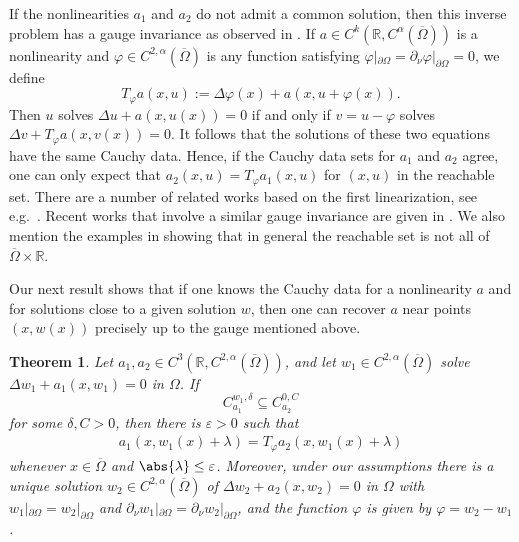 \documentclass[11pt,a4paper]{amsart}
\newtheorem{Theorem}{Theorem}[section]
\theoremstyle{definition}
\numberwithin{equation}{section}
\newcommand{\mR}{\mathbb{R}}                    %
\newcommand{\ol}[1]{\overline{#1}}
\newcommand{\eps}{\varepsilon}
\newcommand{\p}{\partial}
\newcommand{\Om}{\Omega}
\begin{document}
If the nonlinearities $a_1$ and $a_2$ do not admit a common solution, then this inverse problem has a gauge invariance as observed in \cite{Sun}. If $a \in C^{k}(\mR, C^{\alpha}(\ol{\Om}))$ is a nonlinearity and $\varphi \in C^{2,\alpha}(\ol{\Om})$ is any function satisfying $\varphi|_{\p \Om} = \p_{\nu} \varphi|_{\p \Om} = 0$, we define 
\begin{equation}\label{transformation_T}
T_{\varphi} a(x,u) := \Delta \varphi(x) + a(x,u + \varphi(x)).
\end{equation}
Then $u$ solves $\Delta u + a(x,u(x)) = 0$ if and only if $v = u-\varphi$ solves $\Delta v + T_{\varphi} a(x, v(x)) = 0$. It follows that the solutions of these two equations have the same Cauchy data. Hence, if the Cauchy data sets for $a_1$ and $a_2$ agree, one can only expect that $a_2(x,u) = T_{\varphi} a_1(x,u)$ for $(x,u)$ in the reachable set. There are a number of related works based on the first linearization, see e.g.\ \cites{IS, IN, Sun}.
 Recent works that involve a similar gauge invariance are given in \cites{LL23, KLL23}. We also mention the examples in \cites{IS, FKO23} showing that in general the reachable set is not all of $\ol{\Om} \times \mR$.

Our next result shows that if one knows the Cauchy data for a nonlinearity $a$ and for solutions close to a given solution $w$, then one can recover $a$ near points $(x,w(x))$ precisely up to the gauge mentioned above.

\begin{Theorem}\label{thm_main01}
Let $a_1, a_2 \in C^{3}(\mR, C^{2,\alpha}(\ol{\Om}))$, and let $w_1 \in C^{2,\alpha}(\ol{\Om})$ solve $\Delta w_1 + a_1(x,w_1) = 0$ in $\Om$. If 
\[
C_{a_1}^{w_1,\delta} \subseteq C_{a_2}^{0,C}
\]
for some $\delta, C > 0$, then there is $\eps > 0$  such that 
\begin{gather*}
a_1(x,w_1(x)+\lambda) = T_{\varphi} a_2(x,w_1(x)+\lambda)
\end{gather*}
whenever $x \in \ol{\Om}$ and $\abs{\lambda} \leq \eps$. Moreover, under our assumptions there is a unique solution $w_2 \in C^{2,\alpha}(\ol{\Om})$ of $\Delta w_2 + a_2(x,w_2) = 0$ in $\Om$ with $w_1|_{\p \Om} = w_2|_{\p \Om}$ and $\p_{\nu} w_1|_{\p \Om} = \p_{\nu} w_2|_{\p \Om}$, and the function $\varphi$ is given by $\varphi = w_2 - w_1$.
\end{Theorem}
\end{document}
